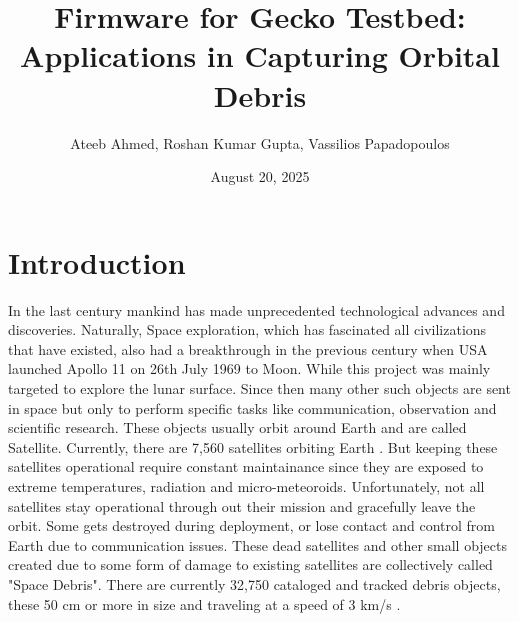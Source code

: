 \documentclass[
    twocolumn,
    fontsize = 10pt,
    parskip = half+,
    headings = small,
    headwidth = text,
    footwidth = text,
]{scrartcl}
\title{Firmware for Gecko Testbed: Applications in Capturing Orbital Debris}
\author{
    \begin{minipage}[t]{.8\textwidth}
        \centering
         Ateeb Ahmed, Roshan Kumar Gupta, Vassilios Papadopoulos
    \end{minipage}
}
\date{August 20, 2025}
\begin{document}


\section{Introduction}
In the last century mankind has made unprecedented technological advances and discoveries. Naturally, Space exploration, which has fascinated all civilizations that have existed, also had a breakthrough in the previous century when USA launched Apollo 11 on 26th July 1969 to Moon. While this project was mainly targeted to explore the lunar surface. Since then many other such objects are sent in space but only to perform specific tasks like communication, observation and scientific research. These objects usually orbit around Earth and are called Satellite. 
Currently, there are 7,560 satellites orbiting Earth \cite{ucs}. But keeping these satellites operational require constant maintainance since they are exposed to extreme temperatures, radiation and micro-meteoroids. Unfortunately, not all satellites stay operational through out their mission and gracefully leave the orbit. Some gets destroyed during deployment, or lose contact and control from Earth due to communication issues. These dead satellites and other small objects created due to some form of damage to existing satellites are collectively called "Space Debris". 
There are currently 32,750 cataloged and tracked debris objects, these 50 cm or more in size and traveling at a speed of 3 km/s \cite{space_junk}. \\
\end{document}
